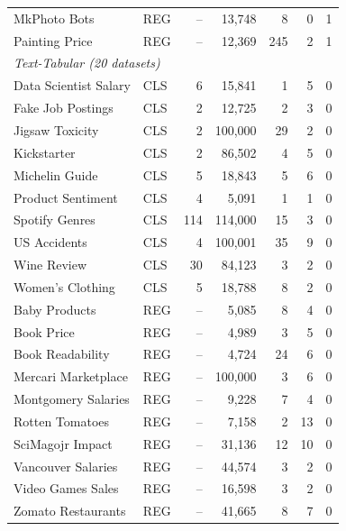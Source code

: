 \begin{table}
\begin{tabular}{llrrrrr}
MkPhoto Bots              & REG &  -- & 13,748  &  8  &  0 & 1 \\
Painting Price            & REG &  -- & 12,369  & 245 &  2 & 1 \\
\midrule
\multicolumn{7}{l}{\textit{Text-Tabular (20 datasets)}} \\
\midrule
Data Scientist Salary     & CLS &   6 & 15,841  &  1  &  5 & 0 \\
Fake Job Postings         & CLS &  2 & 12,725  &  2  &  3 & 0 \\
Jigsaw Toxicity           & CLS &  2 & 100,000 & 29  &  2 & 0 \\
Kickstarter               & CLS &  2 & 86,502  &  4  &  5 & 0 \\
Michelin Guide            & CLS &   5 & 18,843  &  5  &  6 & 0 \\
Product Sentiment         & CLS &   4 &  5,091  &  1  &  1 & 0 \\
Spotify Genres            & CLS & 114 & 114,000 & 15  &  3 & 0 \\
US Accidents              & CLS &   4 & 100,001 & 35  &  9 & 0 \\
Wine Review               & CLS &  30 & 84,123  &  3  &  2 & 0 \\
Women's Clothing          & CLS &   5 & 18,788  &  8  &  2 & 0 \\
Baby Products             & REG &  -- &  5,085  &  8  &  4 & 0 \\
Book Price                & REG &  -- &  4,989  &  3  &  5 & 0 \\
Book Readability          & REG &  -- &  4,724  & 24  &  6 & 0 \\
Mercari Marketplace       & REG &  -- & 100,000 &  3  &  6 & 0 \\
Montgomery Salaries       & REG &  -- &  9,228  &  7  &  4 & 0 \\
Rotten Tomatoes           & REG &  -- &  7,158  &  2  & 13 & 0 \\
SciMagojr Impact          & REG &  -- & 31,136  & 12  & 10 & 0 \\
Vancouver Salaries        & REG &  -- & 44,574  &  3  &  2 & 0 \\
Video Games Sales         & REG &  -- & 16,598  &  3  &  2 & 0 \\
Zomato Restaurants        & REG &  -- & 41,665  &  8  &  7 & 0 \\
\bottomrule
\end{tabular}
\end{table}


